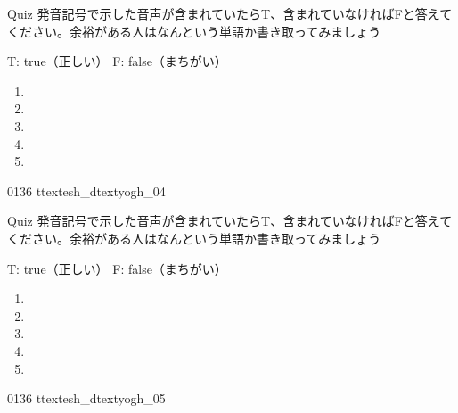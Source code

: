 \documentclass[aspectratio=169, xcolor={dvipsnames,table}]{beamer}
\begin{document}
\begin{frame}[plain]{Quiz }
  発音記号で示した音声が含まれていたらT、含まれていなければFと答えてください。余裕がある人はなんという単語か書き取ってみましょう

  \hfill{}{\scriptsize T: true（正しい）\hspace{5pt} F: false（まちがい）}

  \Large
  \begin{enumerate}
    \item \mbox{}\hspace{1\zw}

    \item \mbox{}\hspace{1\zw}

    \item \mbox{}\hspace{1\zw}

    \item \mbox{}\hspace{1\zw}

    \item \mbox{}\hspace{1\zw}
  \end{enumerate}

  \hfill{\tiny 0136}\,{\scriptsize {}}\,{\tiny ttextesh\_dtextyogh\_04}
\end{frame}
\begin{frame}[plain]{Quiz }
  \large 発音記号で示した音声が含まれていたらT、含まれていなければFと答えてください。余裕がある人はなんという単語か書き取ってみましょう

  \hfill{}{\scriptsize T: true（正しい）\hspace{5pt} F: false（まちがい）}
  \begin{enumerate}
    \item \mbox{}\hspace{1\zw}

    \item \mbox{}\hspace{1\zw}

    \item \mbox{}\hspace{1\zw}

    \item \mbox{}\hspace{1\zw}

    \item \mbox{}\hspace{1\zw}
  \end{enumerate}
  \hfill{\tiny 0136}\,{\scriptsize {}}\,{\tiny ttextesh\_dtextyogh\_05}
\end{frame}
\end{document}
